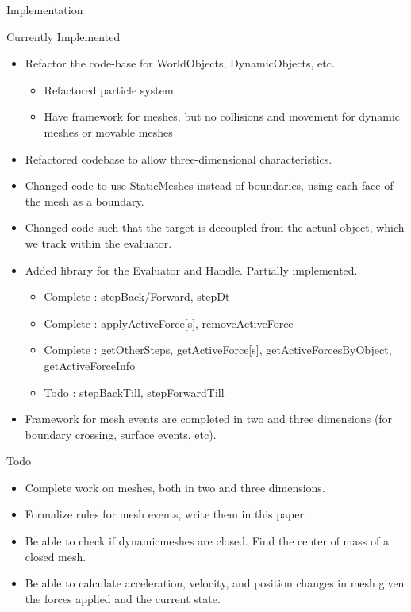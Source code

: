 \documentclass[11pt]{article}
\begin{document}
\begin{section}{Implementation}

\begin{subsection}{Currently Implemented}
\begin{itemize}
\item Refactor the code-base for WorldObjects, DynamicObjects, etc.
\begin{itemize}
\item Refactored particle system
\item Have framework for meshes, but no collisions and movement for dynamic meshes or movable meshes 
\end{itemize}
\item Refactored codebase to allow three-dimensional characteristics. 
\item Changed code to use StaticMeshes instead of boundaries, using each face of the mesh as a boundary. 
\item Changed code such that the target is decoupled from the actual object, which we track within the evaluator.
\item Added library for the Evaluator and Handle. Partially implemented.
\begin{itemize}
\item Complete : stepBack/Forward, stepDt
\item Complete : applyActiveForce[s], removeActiveForce
\item Complete : getOtherSteps, getActiveForce[s], getActiveForcesByObject, getActiveForceInfo
\item Todo : stepBackTill, stepForwardTill
\end{itemize}
\item Framework for mesh events are completed in two and three dimensions (for boundary crossing, surface events, etc). 
\end{itemize}
\end{subsection}
\begin{subsection}{Todo}
\begin{itemize}
\item Complete work on meshes, both in two and three dimensions.
\item Formalize rules for mesh events, write them in this paper.
\item Be able to check if dynamicmeshes are closed. Find the center of mass of a closed mesh.
\item Be able to calculate acceleration, velocity, and position changes in mesh given the forces applied and the current state.

\end{itemize}
\end{subsection}
\end{section}
\end{document}
